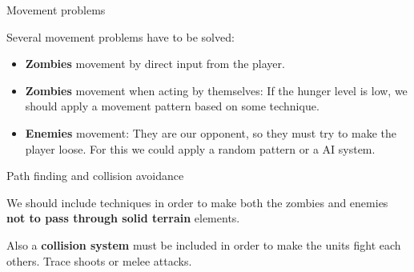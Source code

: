 \documentclass[10pt]{beamer}
\begin{document}
		\begin{frame}{Movement problems}

		  Several movement problems have to be solved:
		\newline
		  \begin{itemize}
		   \item \textbf{Zombies} movement by direct input from the player.\newline
		   \item \textbf{Zombies} movement when acting by themselves: If the hunger level is low, we should apply a movement pattern based on some technique.\newline
		   \item \textbf{Enemies} movement: They are our opponent, so they must try to make the player loose. For this we could apply a random pattern or a AI system.\newline
		  \end{itemize}

		\end{frame}

	      \begin{frame}{Path finding and collision avoidance}
	       
		      We should include techniques in order to make both the zombies and enemies \textbf{not to pass through solid terrain} elements.
	  
		  \vspace{1cm}
		      Also a \textbf{collision system} must be included in order to make the units fight each others. Trace shoots or melee attacks.
	      \end{frame}
\end{document}
